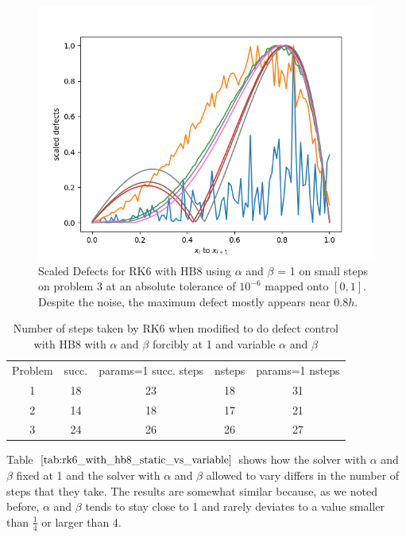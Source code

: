 \begin{figure}[H]
\centering
\includegraphics[width=0.7\linewidth]{./figures/static_alpha_rk6_with_hb8_p3_scaled_defects_small_steps}
\caption{Scaled Defects for RK6 with HB8 using $\alpha$ and $\beta$ = 1 on small steps on problem 3 at an absolute tolerance of $10^{-6}$ mapped onto $[0, 1]$. Despite the noise, the maximum defect mostly appears near $0.8h$.}
\label{fig:static_alpha_rk6_with_hb8_p3_scaled_defects_small_steps}
\end{figure}

\begin{table}[h]
\caption {Number of steps taken by RK6 when modified to do defect control with HB8 with $\alpha$ and $\beta$ forcibly at 1 and variable $\alpha$ and $\beta$} \label{tab:rk6_with_hb8_static_vs_variable}
\begin{center}
\begin{tabular}{ c c c c c } 
Problem & succ. & params=1 succ. steps & nsteps & params=1 nsteps \\ 
1       & 18                      &        23               & 18         & 31\\ 
2       & 14                      &        18               & 17         & 21\\
3       & 24                      &        26               & 26         & 27\\
\end{tabular}
\end{center}
\end{table}	

Table $\ref{tab:rk6_with_hb8_static_vs_variable}$ shows how the solver with $\alpha$ and $\beta$ fixed at 1 and the solver with $\alpha$ and $\beta$ allowed to vary differs in the number of steps that they take. The results are somewhat similar because, as we noted before, $\alpha$ and $\beta$ tends to stay close to 1 and rarely deviates to a value smaller than $\frac{1}{4}$ or larger than 4.

